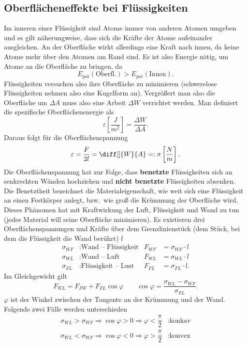 \documentclass[a4paper,12pt]{article}
\begin{document}
\subsection{Oberflächeneffekte bei Flüssigkeiten}
Im inneren einer Flüssigkeit sind Atome immer von anderen Atomen umgeben und es gilt näherungweise, dass sich die Kräfte der Atome aufeinander ausgleichen. An der Oberfläche wirkt allerdings eine Kraft nach innen, da keine Atome mehr über den Atomen am Rand sind. Es ist also Energie nötig, um Atome an die Oberfläche zu bringen, da
\[ 
        E_{\text{pot}}\left(\text{Oberfl.}\right)>E_{\text{pot}}\left(\text{Innen}\right)
.\] 
Flüssigkeiten \glqq versuchen\grqq{} also ihre Oberfläche zu minimieren (schwerelose Flüssigkeiten nehmen also eine Kugelform an). Vergrößert man also die Oberfläche um $\Delta A$ muss also eine Arbeit $\Delta W$ verrichtet werden. Man definiert die spezifische Oberflächenenergie als
\[ 
        \varepsilon \left[\dfrac{J}{m^2}\right]=\dfrac{\Delta W}{\Delta A}
.\] 
Daraus folgt für die Oberflächenspannung
\[ 
        \varepsilon =\dfrac{F}{2l}=\diff[]{W}{A}=:\sigma \left[\dfrac{N}{m}\right]
.\] 
Die Oberflächenspannung hat zur Folge, dass \textbf{benetzte} Flüssigkeiten sich an senkrechten Wänden hochziehen und \textbf{nicht benetzte} Flüssigkeiten absenken. Die Benetztheit bezeichnet die Materialeigenschaft, wie weit sich eine Flüssigkeit an einen Festkörper anlegt, bzw.\ wie groß die Krümmung der Oberfläche wird. Dieses Phänomen hat mit Kraftwirkung der Luft, Flüssigkeit und Wand zu tun (jedes Material will seine Oberfläche minimieren). Es existieren drei Oberflächenspannungen und Kräfte über dem Grenzlinienstück (dem Stück, bei dem die Flüssigkeit die Wand berührt) $l$
\begin{align*}
        \sigma _{WF}&:\text{Wand -- Flüssigkeit}&F_{WF}&=\sigma _{WF}\cdot l\\
        \sigma _{WL}&:\text{Wand -- Luft}&F_{WL}&=\sigma _{WL}\cdot l\\
        \sigma _{FL}&:\text{Flüssigkeit -- Lust}&F_{FL}&=\sigma _{FL}\cdot l
.\end{align*}
Im Gleichgewicht gilt
\[ 
        F_{WL}=F_{FW}+F_{FL}\cos \varphi \qquad \cos \varphi =\dfrac{\sigma _{WL}-\sigma _{WF}}{\sigma _{FL}}
.\] 
$\varphi $ ist der Winkel zwischen der Tangente an der Krümmung und der Wand. Folgende zwei Fälle werden unterschieden
\begin{align*}
        \sigma _{WL}>\sigma _{WF}\Rightarrow \cos \varphi >0\Rightarrow \varphi <\dfrac{\pi }{2}&:\text{konkav}\\
        \sigma _{WL}<\sigma _{WF}\Rightarrow \cos \varphi <0\Rightarrow \varphi >\dfrac{\pi }{2}&:\text{konvex}
\end{align*}
\end{document}
